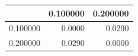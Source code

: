 \begin{tabular}{lrr}
\toprule
 & 0.100000 & 0.200000 \\
\midrule
0.100000 & 0.0000 & 0.0290 \\
0.200000 & 0.0290 & 0.0000 \\
\bottomrule
\end{tabular}
